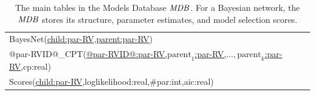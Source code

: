 \documentclass{IEEEtran}
\begin{document}
%
\begin{table}[tbp]
\caption{The main tables in the Models Database $\it{MDB }$. For a Bayesian network, the $\it{MDB }$ stores its structure, parameter estimates, and model selection scores.}
 \centering
 \begin{tabular}
[c]{|l|}\hline
BayesNet(\underline{child:par-RV,parent:par-RV})\\
@par-RVID@\_CPT(\underline{@par-RVID@:par-RV,$\mbox{parent}_{1}$:par-RV,$\ldots,\mbox{parent}_{k}$:par-RV},cp:real)\\ 
Scores(\underline{child:par-RV},loglikelihood:real,\#par:int,aic:real)\\
\hline
\end{tabular}
\label{table:mdb-schema}
\end{table}



%
%
\end{document}
